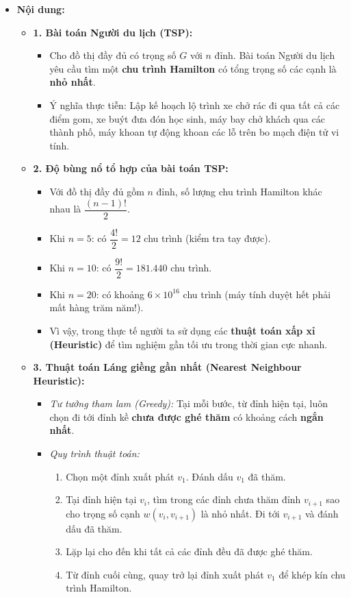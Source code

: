 \documentclass[12pt, a4paper]{article}
\begin{document}
\begin{itemize}[leftmargin=1.2cm]
    \item[b)] \textbf{Nội dung:}
    \begin{itemize}[leftmargin=0.6cm]
        \item \textbf{1. Bài toán Người du lịch (TSP):}
        \begin{itemize}
            \item Cho đồ thị đầy đủ có trọng số $G$ với $n$ đỉnh. Bài toán Người du lịch yêu cầu tìm một \textbf{chu trình Hamilton} có tổng trọng số các cạnh là \textbf{nhỏ nhất}.
            \item Ý nghĩa thực tiễn: Lập kế hoạch lộ trình xe chở rác đi qua tất cả các điểm gom, xe buýt đưa đón học sinh, máy bay chở khách qua các thành phố, máy khoan tự động khoan các lỗ trên bo mạch điện tử vi tính.
        \end{itemize}
        \item \textbf{2. Độ bùng nổ tổ hợp của bài toán TSP:}
        \begin{itemize}
            \item Với đồ thị đầy đủ gồm $n$ đỉnh, số lượng chu trình Hamilton khác nhau là $\dfrac{(n-1)!}{2}$.
            \item Khi $n = 5$: có $\dfrac{4!}{2} = 12$ chu trình (kiểm tra tay được).
            \item Khi $n = 10$: có $\dfrac{9!}{2} = 181.440$ chu trình.
            \item Khi $n = 20$: có khoảng $6 \times 10^{16}$ chu trình (máy tính duyệt hết phải mất hàng trăm năm!).
            \item Vì vậy, trong thực tế người ta sử dụng các \textbf{thuật toán xấp xỉ (Heuristic)} để tìm nghiệm gần tối ưu trong thời gian cực nhanh.
        \end{itemize}
        \item \textbf{3. Thuật toán Láng giềng gần nhất (Nearest Neighbour Heuristic):}
        \begin{itemize}
            \item \textit{Tư tưởng tham lam (Greedy):} Tại mỗi bước, từ đỉnh hiện tại, luôn chọn đi tới đỉnh kề \textbf{chưa được ghé thăm} có khoảng cách \textbf{ngắn nhất}.
            \item \textit{Quy trình thuật toán:}
            \begin{enumerate}[leftmargin=0.6cm]
                \item Chọn một đỉnh xuất phát $v_1$. Đánh dấu $v_1$ đã thăm.
                \item Tại đỉnh hiện tại $v_i$, tìm trong các đỉnh chưa thăm đỉnh $v_{i+1}$ sao cho trọng số cạnh $w(v_i, v_{i+1})$ là nhỏ nhất. Đi tới $v_{i+1}$ và đánh dấu đã thăm.
                \item Lặp lại cho đến khi tất cả các đỉnh đều đã được ghé thăm.
                \item Từ đỉnh cuối cùng, quay trở lại đỉnh xuất phát $v_1$ để khép kín chu trình Hamilton.
            \end{enumerate}
        \end{itemize}
    \end{itemize}


\end{itemize}
\end{document}
